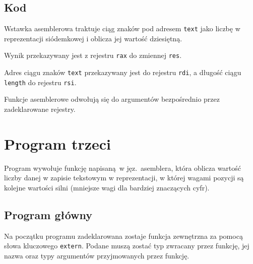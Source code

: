 \documentclass[polish, 11pt]{article}
\begin{document}
	\subsection{Kod}
		\begin{minipage}{.45\textwidth}
			Wstawka asemblerowa traktuje ciąg znaków pod adresem \verb|text| jako liczbę w reprezentacji siódemkowej
			i oblicza jej wartość dziesiętną.
			
			Wynik przekazywany jest z rejestru \verb|rax| do zmiennej \verb|res|.

			Adres ciągu znaków \verb|text| przekazywany jest do rejestru \verb|rdi|,
			a długość ciągu \verb|length| do rejestru \verb|rsi|.

			Funkcje asemblerowe odwołują się do argumentów bezpośrednio przez zadeklarowane rejestry.

		\end{minipage}%
		\hspace{1cm}
		\begin{minipage}{.5\textwidth}
			
		\end{minipage}

\newpage
\section{Program trzeci}
	Program wywołuje funkcję napisaną w jęz.\ asemblera, która oblicza wartość liczby danej w zapisie tekstowym w reprezentacji,
	w której wagami pozycji są kolejne wartości silni (mniejsze wagi dla bardziej znaczących cyfr).
	
	\subsection{Program główny}
		\begin{minipage}{.5\textwidth}
			Na początku programu zadeklarowana zostaje funkcja zewnętrzna za pomocą słowa kluczowego \verb|extern|.
			Podane muszą zostać typ zwracany przez funkcję, jej nazwa oraz typy argumentów przyjmowanych przez funkcję.

		\end{minipage}%
		\hspace{1cm}
		\begin{minipage}{.5\textwidth}
			
		\end{minipage}
	
\end{document}
